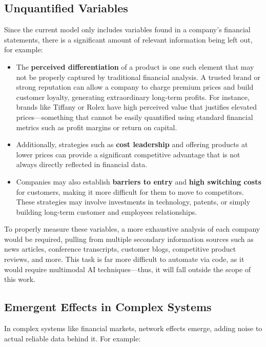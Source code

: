 \documentclass[11pt,english,a4paper,hidelinks]{book}
\begin{document}
\subsection{Unquantified Variables}
\noindent Since the current model only includes variables found in a company's financial statements, there is a significant amount of relevant information being left out, for example:

\begin{itemize}
    \item The \textbf{perceived differentiation} of a product is one such element that may not be properly captured by traditional financial analysis. A trusted brand or strong reputation can allow a company to charge premium prices and build customer loyalty, generating extraordinary long-term profits. For instance, brands like Tiffany or Rolex have high perceived value that justifies elevated prices—something that cannot be easily quantified using standard financial metrics such as profit margins or return on capital.

    \item Additionally, strategies such as \textbf{cost leadership} and offering products at lower prices can provide a significant competitive advantage that is not always directly reflected in financial data.

    \item Companies may also establish \textbf{barriers to entry} and \textbf{high switching costs} for customers, making it more difficult for them to move to competitors. These strategies may involve investments in technology, patents, or simply building long-term customer and employees relationships.
\end{itemize}

\noindent To properly measure these variables, a more exhaustive analysis of each company would be required, pulling from multiple secondary information sources such as news articles, conference transcripts, customer blogs, competitive product reviews, and more. This task is far more difficult to automate via code, as it would require multimodal AI techniques—thus, it will fall outside the scope of this work.

\subsection{Emergent Effects in Complex Systems}

\noindent In complex systems like financial markets, network effects emerge, adding noise to actual reliable data behind it. For example:
\end{document}
